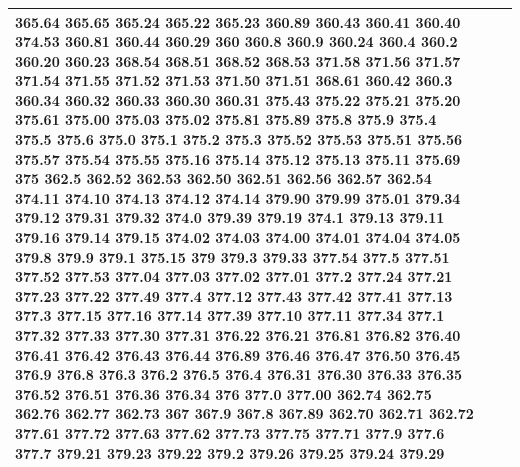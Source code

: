 \documentclass[3p,super,numbers,sort&compress,preprint,10pt]{elsarticle}
\begin{document}
\begin{longtable}{|L{.1in}|L{.6in}||L{5.65in}|}
365.64 365.65 365.24 365.22 365.23 360.89 360.43 360.41 360.40 374.53 360.81 360.44 360.29 360 360.8 360.9 360.24 360.4 360.2 360.20 360.23 368.54 368.51 368.52 368.53 371.58 371.56 371.57 371.54 371.55 371.52 371.53 371.50 371.51 368.61 360.42 360.3 360.34 360.32 360.33 360.30 360.31 375.43 375.22 375.21 375.20 375.61 375.00 375.03 375.02 375.81 375.89 375.8 375.9 375.4 375.5 375.6 375.0 375.1 375.2 375.3 375.52 375.53 375.51 375.56 375.57 375.54 375.55 375.16 375.14 375.12 375.13 375.11 375.69 375 362.5 362.52 362.53 362.50 362.51 362.56 362.57 362.54 374.11 374.10 374.13 374.12 374.14 379.90 379.99 375.01 379.34 379.12 379.31 379.32 374.0 379.39 379.19 374.1 379.13 379.11 379.16 379.14 379.15 374.02 374.03 374.00 374.01 374.04 374.05 379.8 379.9 379.1 375.15 379 379.3 379.33 377.54 377.5 377.51 377.52 377.53 377.04 377.03 377.02 377.01 377.2 377.24 377.21 377.23 377.22 377.49 377.4 377.12 377.43 377.42 377.41 377.13 377.3 377.15 377.16 377.14 377.39 377.10 377.11 377.34 377.1 377.32 377.33 377.30 377.31 376.22 376.21 376.81 376.82 376.40 376.41 376.42 376.43 376.44 376.89 376.46 376.47 376.50 376.45 376.9 376.8 376.3 376.2 376.5 376.4 376.31 376.30 376.33 376.35 376.52 376.51 376.36 376.34 376 377.0 377.00 362.74 362.75 362.76 362.77 362.73 367 367.9 367.8 367.89 362.70 362.71 362.72 377.61 377.72 377.63 377.62 377.73 377.75 377.71 377.9 377.6 377.7 379.21 379.23 379.22 379.2 379.26 379.25 379.24 379.29\\\hline

\end{longtable}
\end{document}
